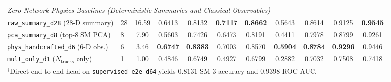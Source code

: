 \documentclass{article}
\begin{document}
\begin{table}[htbp]
{\begin{tabular}{llccccccccc}
\midrule
\multicolumn{11}{l}{\textit{Zero-Network Physics Baselines (Deterministic Summaries and Classical Observables)}} \\
\texttt{raw\_summary\_d28} (28-D summary) & 28 & 16.59 & 0.6413 & 0.8132 & \textbf{0.7117} & \textbf{0.8662} & 0.5643 & 0.8614 & 0.9125 & \textbf{0.9545} \\
\texttt{pca\_summary\_d8} (top-8 SM PCA) & 8 & 7.90 & 0.5603 & 0.7426 & 0.6473 & 0.8191 & 0.4411 & 0.7978 & 0.8799 & 0.9261 \\
\texttt{phys\_handcrafted\_d6} (6-D obs.) & 6 & 3.46 & \textbf{0.6747} & \textbf{0.8383} & 0.7003 & 0.8570 & \textbf{0.5904} & \textbf{0.8784} & \textbf{0.9296} & 0.9446 \\
\texttt{mult\_only\_d1} ($N_{\text{tracks}}$ only) & 1 & 1.00 & 0.4846 & 0.6749 & 0.4927 & 0.6799 & 0.2882 & 0.7032 & 0.7508 & 0.7418 \\
\bottomrule
\multicolumn{11}{l}{\footnotesize $^\dagger$Direct end-to-end head on \texttt{supervised\_e2e\_d64} yields $0.8131$ SM-3 accuracy and $0.9398$ ROC-AUC.}
\end{tabular}%
}
\end{table}
\end{document}
